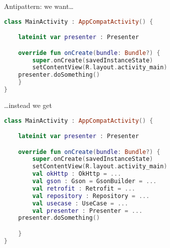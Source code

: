 \documentclass[10pt]{beamer}
\begin{document}
\begin{frame}[fragile]
Antipattern: we want\ldots 
\begin{lstlisting}[language=Kotlin, basicstyle=\ttfamily]
class MainActivity : AppCompatActivity() {

    lateinit var presenter : Presenter

    override fun onCreate(bundle: Bundle?) {
        super.onCreate(savedInstanceState)
        setContentView(R.layout.activity_main)
	presenter.doSomething()
    }
}
\end{lstlisting} 
\end{frame}

\begin{frame}[fragile]
	\ldots instead  we get
\begin{lstlisting}[language=Kotlin, basicstyle=\ttfamily]
class MainActivity : AppCompatActivity() {

    lateinit var presenter : Presenter

    override fun onCreate(bundle: Bundle?) {
        super.onCreate(savedInstanceState)
        setContentView(R.layout.activity_main)
        val okHttp : OkHttp = ...
        val gson : Gson = GsonBuilder = ...
        val retrofit : Retrofit = ...
        val repository : Repository = ...
        val usecase : UseCase = ...
        val presenter : Presenter = ...
	presenter.doSomething()

    }
}
\end{lstlisting} 
\end{frame}
\end{document}
